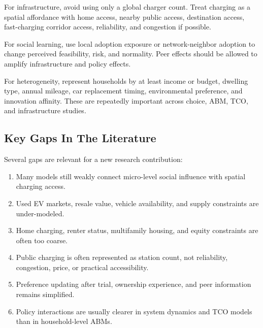\documentclass[
]{article}
\providecommand{\tightlist}{%
  \setlength{\itemsep}{0pt}\setlength{\parskip}{0pt}}
\begin{document}
For infrastructure, avoid using only a global charger count. Treat
charging as a spatial affordance with home access, nearby public access,
destination access, fast-charging corridor access, reliability, and
congestion if possible.

For social learning, use local adoption exposure or network-neighbor
adoption to change perceived feasibility, risk, and normality. Peer
effects should be allowed to amplify infrastructure and policy effects.

For heterogeneity, represent households by at least income or budget,
dwelling type, annual mileage, car replacement timing, environmental
preference, and innovation affinity. These are repeatedly important
across choice, ABM, TCO, and infrastructure studies.

\subsection{Key Gaps In The
Literature}\label{key-gaps-in-the-literature}

Several gaps are relevant for a new research contribution:

\begin{enumerate}
\def\labelenumi{\arabic{enumi}.}
\tightlist
\item
  Many models still weakly connect micro-level social influence with
  spatial charging access.
\item
  Used EV markets, resale value, vehicle availability, and supply
  constraints are under-modeled.
\item
  Home charging, renter status, multifamily housing, and equity
  constraints are often too coarse.
\item
  Public charging is often represented as station count, not
  reliability, congestion, price, or practical accessibility.
\item
  Preference updating after trial, ownership experience, and peer
  information remains simplified.
\item
  Policy interactions are usually clearer in system dynamics and TCO
  models than in household-level ABMs.
\end{enumerate}
\end{document}
